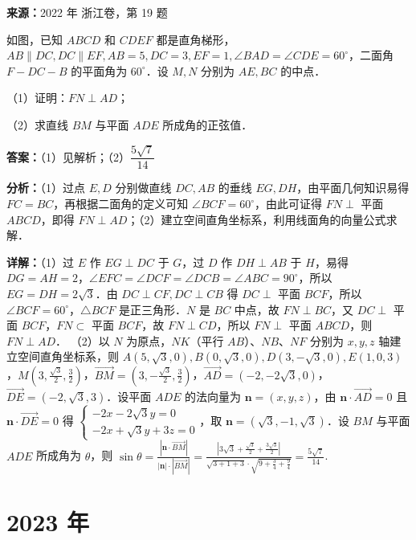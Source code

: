 \begin{question}[points=15]
\textbf{来源：}2022 年 浙江卷，第 19 题\par
如图，已知 $ABCD$ 和 $CDEF$ 都是直角梯形，$AB\parallel DC, DC\parallel EF, AB=5, DC=3, EF=1, \angle BAD = \angle CDE = 60^\circ$，二面角 $F-DC-B$ 的平面角为 $60^\circ$．设 $M,N$ 分别为 $AE, BC$ 的中点．

（1）证明：$FN \perp AD$；

（2）求直线 $BM$ 与平面 $ADE$ 所成角的正弦值．
\begin{solution}
\textbf{答案：}（1）见解析；（2）$\dfrac{5\sqrt{7}}{14}$

\textbf{分析：}（1）过点 $E,D$ 分别做直线 $DC,AB$ 的垂线 $EG,DH$，由平面几何知识易得 $FC=BC$，再根据二面角的定义可知 $\angle BCF=60^\circ$，由此可证得 $FN\perp$ 平面 $ABCD$，即得 $FN\perp AD$；（2）建立空间直角坐标系，利用线面角的向量公式求解．

\textbf{详解：}（1）过 $E$ 作 $EG\perp DC$ 于 $G$，过 $D$ 作 $DH\perp AB$ 于 $H$，易得 $DG=AH=2$，$\angle EFC = \angle DCF = \angle DCB = \angle ABC = 90^\circ$，所以 $EG=DH=2\sqrt{3}$．由 $DC\perp CF, DC\perp CB$ 得 $DC\perp$ 平面 $BCF$，所以 $\angle BCF=60^\circ$，$\triangle BCF$ 是正三角形．$N$ 是 $BC$ 中点，故 $FN\perp BC$，又 $DC\perp$ 平面 $BCF$，$FN\subset$ 平面 $BCF$，故 $FN\perp CD$，所以 $FN\perp$ 平面 $ABCD$，则 $FN\perp AD$．
（2）以 $N$ 为原点，$NK$（平行 $AB$）、$NB$、$NF$ 分别为 $x,y,z$ 轴建立空间直角坐标系，则 $A(5,\sqrt{3},0), B(0,\sqrt{3},0), D(3,-\sqrt{3},0), E(1,0,3)$，$M\left(3,\frac{\sqrt{3}}{2},\frac{3}{2}\right)$，$\overrightarrow{BM} = \left(3,-\frac{\sqrt{3}}{2},\frac{3}{2}\right)$，$\overrightarrow{AD}=(-2,-2\sqrt{3},0)$，$\overrightarrow{DE}=(-2,\sqrt{3},3)$．设平面 $ADE$ 的法向量为 $\mathbf{n}=(x,y,z)$，由 $\mathbf{n}\cdot\overrightarrow{AD}=0$ 且 $\mathbf{n}\cdot\overrightarrow{DE}=0$ 得 $\begin{cases} -2x-2\sqrt{3}y=0 \\ -2x+\sqrt{3}y+3z=0 \end{cases}$，取 $\mathbf{n}=(\sqrt{3},-1,\sqrt{3})$．设 $BM$ 与平面 $ADE$ 所成角为 $\theta$，则 $\sin\theta = \frac{|\mathbf{n}\cdot\overrightarrow{BM}|}{|\mathbf{n}|\cdot|\overrightarrow{BM}|} = \frac{|3\sqrt{3}+\frac{\sqrt{3}}{2}+\frac{3\sqrt{3}}{2}|}{\sqrt{3+1+3}\cdot\sqrt{9+\frac{3}{4}+\frac{9}{4}}} = \frac{5\sqrt{7}}{14}$.
\end{solution}
\end{question}

\section*{2023 年}

